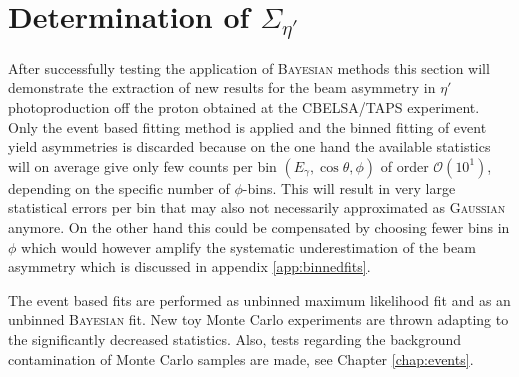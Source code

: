       
\section{Determination of $\Sigma_{\eta'}$}
\label{sec:sigma_etap}
After successfully testing the application of \textsc{Bayesian} methods this section will demonstrate the extraction of new results for the beam asymmetry in $\eta'$ photoproduction off the proton obtained at the CBELSA/TAPS experiment. Only the event based fitting method is applied and the binned fitting of event yield asymmetries is discarded because on the one hand the available statistics will on average give only few counts per bin $\left(E_\gamma,\cos\theta,\phi\right)$ of order $\mathcal{O}\left(10^1\right)$, depending on the specific number of $\phi$-bins. This will result in very large statistical errors per bin that may also not necessarily approximated as \textsc{Gaussian} anymore. On the other hand this could be compensated by choosing fewer bins in $\phi$ which would however amplify the systematic underestimation of the beam asymmetry which is discussed in appendix \ref{app:binnedfits}.

The event based fits are performed as unbinned maximum likelihood fit and as an unbinned \textsc{Bayesian} fit. New toy Monte Carlo experiments are thrown adapting to the significantly decreased statistics. Also, tests regarding the background contamination of Monte Carlo samples are made, see Chapter \ref{chap:events}.   
